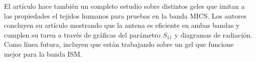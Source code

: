 El artículo hace también un completo estudio sobre distintos geles que imitan a las propiedades el tejidos humanos para pruebas en la banda MICS. Los autores concluyen su artículo mostrando que la antena es eficiente en ambas bandas y cumplen su tarea a través de gráficas del parámetro $S_{11}$ y diagramas de radiación. Como línea futura, incluyen que están trabajando sobre un gel que funcione mejor para la banda ISM.
